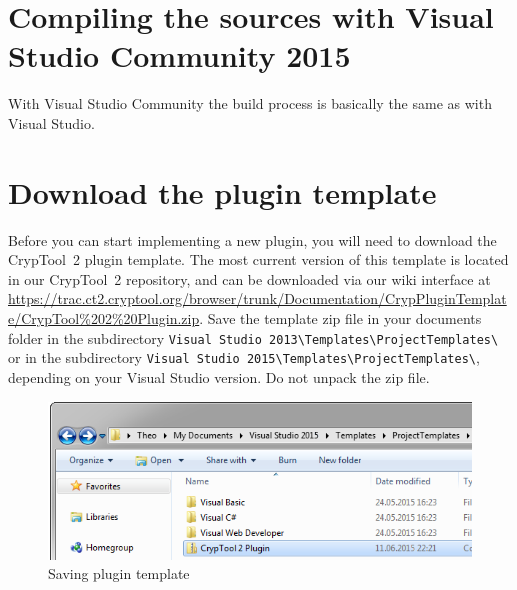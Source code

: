 \section{Compiling the sources with Visual Studio Community 2015}
\label{CompilingTheSourcesExpress}

With Visual Studio Community the build process is basically the same as with Visual Studio.

\section{Download the plugin template}
\label{DownloadingThePluginTemplate}

Before you can start implementing a new plugin, you will need to download the CrypTool~2 plugin template. The most current version of this template is located in our CrypTool~2 repository, and can be downloaded via our wiki interface at \url{https://trac.ct2.cryptool.org/browser/trunk/Documentation/CrypPluginTemplate/CrypTool\%202\%20Plugin.zip}. Save the template zip file in your documents folder in the subdirectory \texttt{Visual Studio 2013\textbackslash{}Templates\textbackslash{}ProjectTemplates\textbackslash{}} or in the subdirectory \texttt{Visual Studio 2015\textbackslash{}Templates\textbackslash{}ProjectTemplates\textbackslash{}}, depending on your Visual Studio version. Do not unpack the zip file.

\begin{figure}[htbp]
	\centering
		\includegraphics{figures/vs_template.png}
	\caption{Saving plugin template}
	\label{fig:vs_template}
\end{figure}
\clearpage

